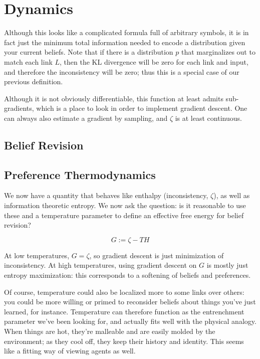 \documentclass{article}
\begin{document}
	\section{Dynamics}
	
	Although this looks like a complicated formula full of arbitrary symbols, it is in fact just the minimum total information needed to encode a distribution given your current beliefs. Note that if there is a distribution $p$ that marginalizes out to match each link $L$, then the KL divergence will be zero for each link and input, and therefore the inconsistency will be zero; thus this is a special case of our previous definition.
	
	Although it is not obviously differentiable, this function at least admits sub-gradients, which is a place to look in order to implement gradient descent. One can always also estimate a gradient by sampling, and $\zeta$ is at least continuous.
	
	\subsection{Belief Revision}
	

	
	\subsection{Preference Thermodynamics} \label{sec:thermo}
	We now have a quantity that behaves like enthalpy (inconsistency, $\zeta$), as well as information theoretic entropy. We now ask the question: is it reasonable to use these and a temperature parameter to define an effective free energy for belief revision?
	
	\[ G := \zeta - T H \]
	

	At low temperatures, $G = \zeta$, so gradient descent is just minimization of inconsistency. At high temperatures, using gradient descent on $G$ is mostly just entropy maximization: this corresponds to a softening of beliefs and preferences. 
	
	Of course, temperature could also be localized more to some links over others: you could be more willing or primed to reconsider beliefs about things you've just learned, for instance. Temperature can therefore function as the entrenchment parameter we've been looking for, and actually fits well with the physical analogy. When things are hot, they're malleable and are easily molded by the environment; as they cool off, they keep their history and identity. This seems like a fitting way of viewing agents as well.
	
\end{document}
